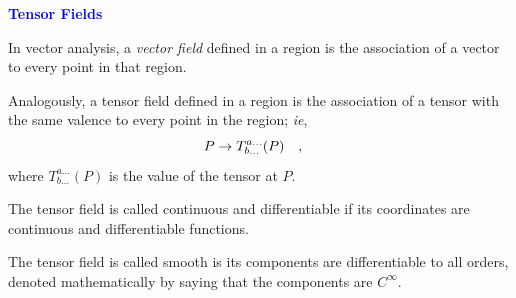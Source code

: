 \documentclass[landscape,aspectratio=169]{slides}
\begin{document}
\begin{slide}
	\textcolor{blue}{\textbf{Tensor Fields}}
	
	In vector analysis, a \textit{vector field} defined in a region is the association of a vector to every point in that region.
	
	Analogously, a tensor field defined in a region is the association of a tensor with the same valence to every point in the region; \textit{ie},
	\begin{equation*}\label{key}
	P \rightarrow T^{a \ldots}_{b\ldots} (P) \qq{,}
	\end{equation*}
	where $  T^{a \ldots}_{b\ldots} (P) $ is the value of the tensor at $ P $.
	
	The tensor field is called continuous and differentiable if its coordinates are continuous and differentiable functions. 
	
	The tensor field is called smooth is its components are differentiable to all orders, denoted mathematically by saying that the components are $ C^\infty $.
	
\end{slide}
\end{document}

